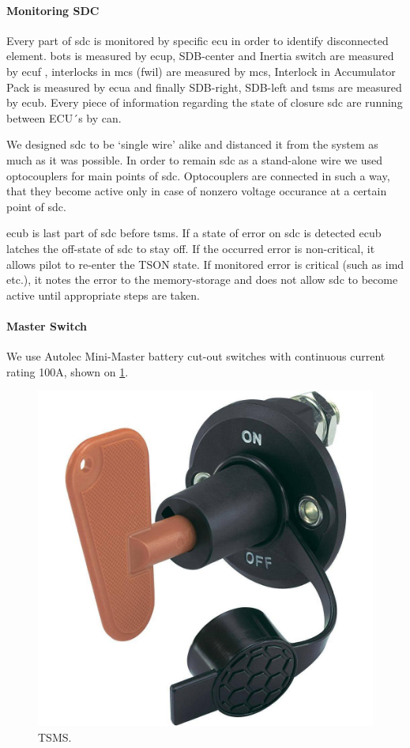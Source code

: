 \paragraph{Monitoring SDC}
Every part of \gls{sdc} is monitored by specific \gls{ecu} in order to identify disconnected element. \gls{bots} is measured by \gls{ecup}, SDB-center  and Inertia switch are measured by \gls{ecuf} , interlocks in \glspl{mc} (\gls{fwil}) are measured by \glspl{mc}, Interlock in Accumulator Pack is measured by \gls{ecua}  and finally SDB-right, SDB-left and \gls{tsms} are measured by \gls{ecub}. Every piece of information regarding the state of closure \gls{sdc} are running between ECU´s by \gls{can}. 

We designed \gls{sdc} to be ‘single wire’ alike and distanced it from the system as much as it was possible. In order to remain \gls{sdc} as a stand-alone wire we used optocouplers for main points of \gls{sdc}. Optocouplers are connected in such a way, that they become active only in case of nonzero voltage occurance at a certain point of \gls{sdc}.

\Gls{ecub} is last part of \gls{sdc} before \gls{tsms}. If a state of error on \gls{sdc} is detected \gls{ecub} latches the off-state of \gls{sdc} to stay off. If the occurred error is non-critical, it allows pilot to re-enter the TSON state. If monitored error is critical (such as \gls{imd} etc.), it notes the error to the memory-storage and does not allow \gls{sdc} to become active until appropriate steps are taken.

\paragraph{Master Switch}
We use Autolec Mini-Master battery cut-out switches with continuous current rating 100A, shown on \ref{fig:SDC-TSMS}.
\begin{figure}[H]
	\centering
	\includegraphics[width=.5\textwidth]{./img/SDC-TSMS.jpg}
	\caption{TSMS.}
	\label{fig:SDC-TSMS}
\end{figure}

